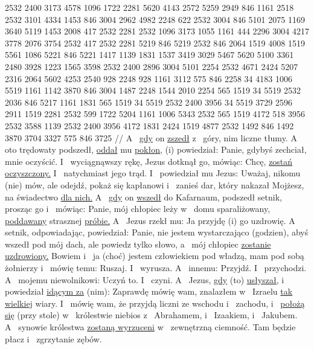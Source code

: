 {} 2532 2400 3173 4578 1096 1722 2281 5620 4143 2572 5259 2949 846 1161 2518
{} 2532 3101 4334 1453 846 3004 2962 4982 2248 622
{} 2532 3004 846 5101 2075 1169 3640 5119 1453 2008 417 2532 2281 2532 1096 3173 1055
{} 1161 444 2296 3004 4217 3778 2076 3754 2532 417 2532 2281 5219 846 5219
{} 2532 846 2064 1519 4008 1519 5561 1086 5221 846 5221 1417 1139 {} 1831 1537 3419 3029 5467 5620 5100 3361 2480 3928 1223 1565 3598
{} 2532 2400 2896 3004 5101 2254 2532 4671 2424 5207 2316 2064 5602 4253 2540 928 2248 928
{} 1161 3112 575 846 2258 34 4183 1006 5519
{} 1161 1142 3870 846 3004 1487 2248 1544 2010 2254 565 1519 34 5519
{} 2532 2036 846 5217 1161 1831 565 1519 34 5519 2532 2400 3956 34 5519 3729 2596 2911 1519 2281 2532 599 1722 5204
{} 1161 1006 5343 2532 565 1519 4172 518 3956 2532 3588 1139
{} 2532 2400 3956 4172 1831 2424 1519 4877 2532 1492 846 1492 3870 3704 3327 {} 575 846 3725
//
\glb
 A~ \underline{gdy} on \underline{zszedł} z~ góry,  nim liczne tłumy.
 A~ oto trędowaty podszedł, \underline{oddał} mu \underline{pokłon,} (i) powiedział: Panie, gdybyś zechciał,  mnie oczyścić.
 I~ wyciągnąwszy rękę, Jezus dotknął go, mówiąc: Chcę, \underline{zostań oczyszczony.} I~ natychmiast  jego trąd.
 I~ powiedział mu Jezus: Uważaj, nikomu (nie) mów, ale odejdź, pokaż się kapłanowi i~ zanieś dar, który nakazał Mojżesz, na świadectwo \underline{dla nich.}
 A~ \underline{gdy} on \underline{wszedł} do Kafarnaum, podszedł  setnik, prosząc go
 i~ mówiąc: Panie, mój chłopiec leży w~ domu sparaliżowany, \underline{poddawany} strasznej \underline{próbie.}
 A~ Jezus rzekł mu: Ja przyjdę (i) go uzdrowię.
 A~ setnik, odpowiadając, powiedział: Panie, nie jestem wystarczająco (godzien), abyś wszedł pod mój dach, ale powiedz tylko słowo, a~ mój chłopiec \underline{zostanie uzdrowiony.}
 Bowiem i~ ja (choć) jestem człowiekiem pod władzą, mam pod sobą żołnierzy i~ mówię temu: Ruszaj. I~ wyrusza. A~ innemu: Przyjdź. I~ przychodzi. A~ mojemu niewolnikowi: Uczyń to. I~ czyni.
 A~ Jezus, \underline{gdy} (to) \underline{usłyszał,}  i~ powiedział \underline{idącym za} (nim): Zaprawdę mówię wam,  znalazłem w~ Izraelu \underline{tak wielkiej} wiary.
 I~ mówię wam, że przyjdą liczni ze wschodu i~ zachodu, i~ \underline{położą się} (przy stole) w~ królestwie niebios z~ Abrahamem, i~ Izaakiem, i~ Jakubem.
 A~ synowie królestwa \underline{zostaną wyrzuceni} w~ zewnętrzną ciemność. Tam będzie płacz i~ zgrzytanie zębów.
